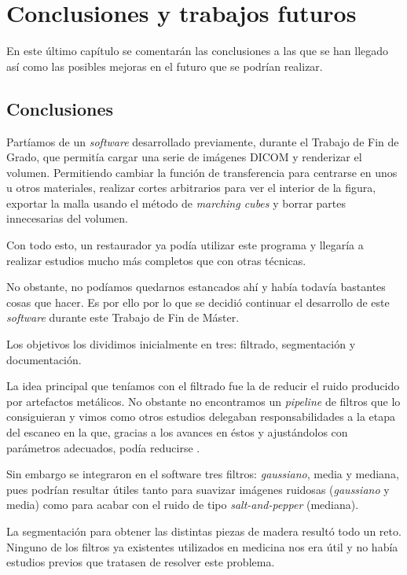 \chapter{Conclusiones y trabajos futuros}

En este último capítulo se comentarán las conclusiones a las que se han llegado así como las posibles mejoras en el futuro que se podrían realizar.

\section{Conclusiones}

Partíamos de un \textit{software} desarrollado previamente, durante el Trabajo de Fin de Grado, que permitía cargar una serie de imágenes DICOM y renderizar el volumen. Permitiendo cambiar la función de transferencia para centrarse en unos u otros materiales, realizar cortes arbitrarios para ver el interior de la figura, exportar la malla usando el método de \textit{marching cubes} y borrar partes innecesarias del volumen.

Con todo esto, un restaurador ya podía utilizar este programa y llegaría a realizar estudios mucho más completos que con otras técnicas.

No obstante, no podíamos quedarnos estancados ahí y había todavía bastantes cosas que hacer. Es por ello por lo que se decidió continuar el desarrollo de este \textit{software} durante este Trabajo de Fin de Máster.

Los objetivos los dividimos inicialmente en tres: filtrado, segmentación y documentación.

La idea principal que teníamos con el filtrado fue la de reducir el ruido producido por artefactos metálicos. No obstante no encontramos un \textit{pipeline} de filtros que lo consiguieran y vimos como otros estudios delegaban responsabilidades a la etapa del escaneo en la que, gracias a los avances en éstos y ajustándolos con parámetros adecuados, podía reducirse \cite{boas12}.

Sin embargo se integraron en el software tres filtros: \textit{gaussiano}, media y mediana, pues podrían resultar útiles tanto para suavizar imágenes ruidosas (\textit{gaussiano} y media) como para acabar con el ruido de tipo \textit{salt-and-pepper} (mediana).

La segmentación para obtener las distintas piezas de madera resultó todo un reto. Ninguno de los filtros ya existentes utilizados en medicina nos era útil y no había estudios previos que tratasen de resolver este problema.

